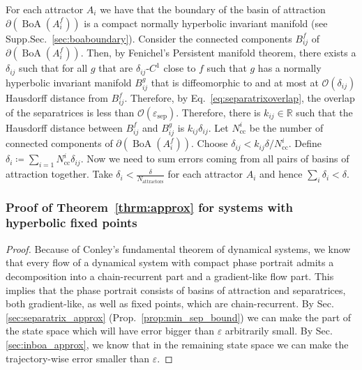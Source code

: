 \documentclass{article}
\theoremstyle{definition} \newtheorem{definition}{Definition}
\theoremstyle{remark} \newtheorem{remark}{Remark}
\newcommand{\reals}{\mathbb{R}}
\newcommand{\boa}{\operatorname{BoA}}
\newcounter{ct}
\begin{document}
For each attractor $A_i$ we have that the boundary of the basin of attraction $\partial(\boa(A_i^f))$ is a compact normally hyperbolic invariant manifold (see Supp.Sec.~\ref{sec:boaboundary}).
Consider the connected components $B^f_{ij}$ of $\partial(\boa(A_i^f))$. %
Then, by Fenichel's Persistent manifold theorem, there exists a $\delta_{ij}$ such that for all $g$ that are $\delta_{ij}$-$C^1$ close to $f$ such that $g$ has a normally hyperbolic invariant manifold  $B^g_{ij}$ that is diffeomorphic to and at most at $\mathcal{O}(\delta_{ij})$ Hausdorff distance from $B^f_{ij}$.
Therefore, by Eq.~\ref{eq:separatrixoverlap}, the overlap of the separatrices is less than $\mathcal{O}(\varepsilon_{\operatorname{sep}})$. %
Therefore, there is $k_{ij}\in\reals$ such that the Hausdorff distance between $B^f_{ij}$ and $B^g_{ij}$ is $k_{ij}\delta_{ij}$.
Let  $N_{\operatorname{cc}}^i$ be the number of connected components of $\partial(\boa(A_i^f))$.
Choose $\delta_{ij}<k_{ij}\delta/N_{\operatorname{cc}}^i$. 
Define $\delta_i\coloneqq\sum_{i=1}{N_{\operatorname{cc}}^i}\delta_{ij}$.
Now we need to sum errors coming from all pairs of basins of attraction together.
Take $\delta_i< \frac{\delta}{N_{\operatorname{attractors}}}$ for each attractor $A_i$ and hence $\sum_i\delta_i<\delta$.





\subsubsection{Proof of Theorem~\ref{thrm:approx} for systems with hyperbolic fixed points}\label{sec:proof_fp_approx}
\begin{proof}%
Because of Conley's fundamental theorem of dynamical systems\citep{conley1978morse}, we know that every flow of a dynamical system with compact phase portrait admits a decomposition into a chain-recurrent part and a gradient-like flow part.
This implies that the phase portrait consists of basins of attraction and separatrices, both gradient-like, as well as fixed points, which are chain-recurrent.
%
By Sec.\ref{sec:separatrix_approx} (Prop.~\ref{prop:min_sep_bound}) we can make the part of the state space which will have error bigger than $\varepsilon$ arbitrarily small. %
By Sec.\ref{sec:inboa_approx}, we know that in the remaining state space we can make the trajectory-wise error smaller than $\varepsilon$.
\end{proof}
\end{document}
